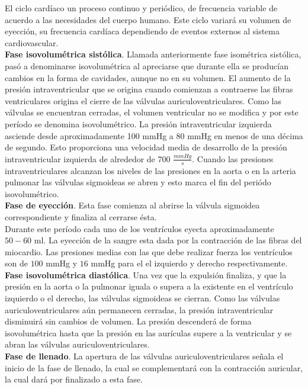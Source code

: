 El ciclo cardíaco un proceso continuo y periódico, de frecuencia variable de acuerdo a las necesidades del cuerpo humano. Este ciclo variará su volumen de eyección, su frecuencia cardíaca dependiendo de eventos externos al sistema cardiovascular. \\
\indent \textbf{Fase isovolumétrica sistólica}. Llamada anteriormente fase isométrica sistólica, pasó a denominarse isovolumétrica al apreciarse que durante ella se producían cambios en la forma de cavidades, aunque no en su volumen. El aumento de la presión intraventricular que se origina cuando comienzan a contraerse las fibras ventriculares origina el cierre de las válvulas auriculoventriculares. Como las válvulas se encuentran cerradas, el volumen ventricular no se modifica y por este período se denomina isovolumétrico. La presión intraventricular izquierda asciende desde aproximadamente 100 mmHg a 80 mmHg en menos de una décima de segundo. Esto proporciona una velocidad media de desarrollo de la presión intraventricular izquierda de alrededor de 700 $\frac{mmHg}{s}$. Cuando las presiones intraventriculares alcanzan los niveles de las presiones en la aorta o en la arteria pulmonar las válvulas sigmoideas se abren y esto marca el fin del periódo isovolumétrico. \\
\indent \textbf{Fase de eyección}. Esta fase comienza al abrirse la válvula sigmoidea correspondiente y finaliza al cerrarse ésta. \\
\indent Durante este período cada uno de los ventrículos eyecta aproximadamente $50-60$ ml. La eyección de la sangre esta dada por la contracción de las fibras del miocardio. Las presiones medias con las que debe realizar fuerza los ventrículos son de $100$ mmHg y $16$ mmHg para el el izquierdo y derecho respectivamente. \\
\indent \textbf{Fase isovolumétrica diastólica}. Una vez que la expulsión finaliza, y que la presión en la aorta o la pulmonar iguala o supera a la existente en el ventrículo izquierdo o el derecho, las válvulas sigmoideas se cierran. Como las válvulas auriculoventriculares aún permanecen cerradas, la presión intraventricular disminuirá sin cambios de volumen. La presión descenderá de forma isovolumétrica hasta que la presión en las aurículas supere a la ventricular y se abran las válvulas auriculoventriculares. \\
\indent \textbf{Fase de llenado}. La apertura de las válvulas auriculoventriculares señala el inicio de la fase de llenado, la cual se complementará con la contracción auricular, la cual dará por finalizado a esta fase.
    
